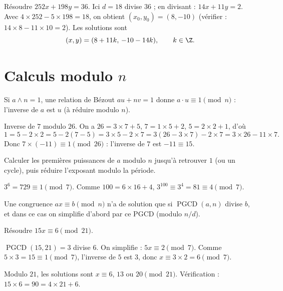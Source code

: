 \begin{exemple}
Résoudre $252x+198y=36$. Ici $d=18$ divise $36$ ; en divisant : $14x+11y=2$. Avec $4\times252-5\times198=18$, on obtient $(x_0,y_0)=(8,-10)$ (vérifier : $14\times8-11\times10=2$). Les solutions sont
\[
  (x,y)=(8+11k,\,-10-14k),\qquad k\in\Z .
\]
\end{exemple}

\section{Calculs modulo $n$}

\begin{methode}
Si $a\wedge n=1$, une relation de Bézout $au+nv=1$ donne $a\cdot u\equiv1\pmod n$ : l'inverse de $a$ est $u$ (à réduire modulo $n$).
\end{methode}

\begin{exemple}
Inverse de $7$ modulo $26$. On a $26=3\times7+5$, $7=1\times5+2$, $5=2\times2+1$, d'où
\[
  1=5-2\times2=5-2(7-5)=3\times5-2\times7=3(26-3\times7)-2\times7=3\times26-11\times7 .
\]
Donc $7\times(-11)\equiv1\pmod{26}$ : l'inverse de $7$ est $-11\equiv15$.
\end{exemple}

\begin{methode}
Calculer les premières puissances de $a$ modulo $n$ jusqu'à retrouver $1$ (ou un cycle), puis réduire l'exposant modulo la période.
\end{methode}

\begin{exemple}
$3^6=729\equiv1\pmod7$. Comme $100=6\times16+4$, $3^{100}\equiv3^4=81\equiv4\pmod7$.
\end{exemple}

\begin{attention}
Une congruence $ax\equiv b\pmod n$ n'a de solution que si $\operatorname{PGCD}(a,n)$ divise $b$, et dans ce cas on simplifie d'abord par ce PGCD (modulo $n/d$).
\end{attention}

\begin{exercice}[Application]
Résoudre $15x\equiv6\pmod{21}$.
\begin{correction}
$\operatorname{PGCD}(15,21)=3$ divise $6$. On simplifie : $5x\equiv2\pmod7$. Comme $5\times3=15\equiv1\pmod 7$, l'inverse de $5$ est $3$, donc $x\equiv3\times2=6\pmod7$.

Modulo $21$, les solutions sont $x\equiv6$, $13$ ou $20\pmod{21}$. Vérification : $15\times6=90=4\times21+6$.
\end{correction}
\end{exercice}

